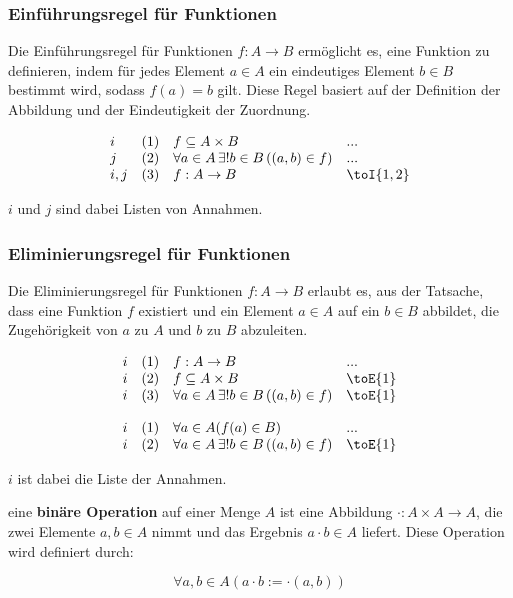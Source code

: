 \documentclass[main.tex]{subfiles}
\begin{document}
\subsubsection*{Einführungsregel für Funktionen}
\label{rule:toI}
Die Einführungsregel für Funktionen \( f: A \to B \) ermöglicht es, eine Funktion zu definieren, indem für jedes Element \( a \in A \) ein eindeutiges Element \( b \in B \) bestimmt wird, sodass \( f(a) = b \) gilt. Diese Regel basiert auf der Definition der Abbildung und der Eindeutigkeit der Zuordnung.

\[
\begin{array}{llll}
    i       & (1) & f\subseteq A\times B & ... \\
    j       & (2) & \forall a \in A \, \exists! b \in B \, ((a, b) \in f) & ... \\
    i,j     & (3) & f:A\rightarrow B & \toI{1,2}
\end{array}
\]

\(i\) und \(j\) sind dabei Listen von Annahmen.

\subsubsection*{Eliminierungsregel für Funktionen}
\label{rule:toE}
Die Eliminierungsregel für Funktionen \( f: A \to B \) erlaubt es, aus der Tatsache, dass eine Funktion \( f \) existiert und ein Element \( a \in A \) auf ein \( b \in B \) abbildet, die Zugehörigkeit von \( a \) zu \( A \) und \( b \) zu \( B \) abzuleiten.

\[
\begin{array}{llll}
    i       & (1) & f:A\rightarrow B & ... \\
    i       & (2) & f\subseteq A\times B & \toE{1} \\
    i       & (3) & \forall a \in A \, \exists! b \in B \, ((a, b) \in f) & \toE{1} \\
\end{array}
\]

\[
\begin{array}{llll}
    i       & (1) & \forall a\in A(f(a)\in B) & ... \\
    i       & (2) & \forall a \in A \, \exists! b \in B \, ((a, b) \in f) & \toE{1} \\
\end{array}
\]

\(i\) ist dabei die Liste der Annahmen.

\begin{definition}
    eine \textbf{binäre Operation} auf einer Menge \( A \) ist eine Abbildung \( \cdot : A \times A \to A \), die zwei Elemente \( a, b \in A \) nimmt und das Ergebnis \( a \cdot b \in A \) liefert. Diese Operation wird definiert durch:
    
    \[
    \forall a,b\in A(a \cdot b := \cdot(a, b)) 
    \]
\end{definition}
\end{document}
